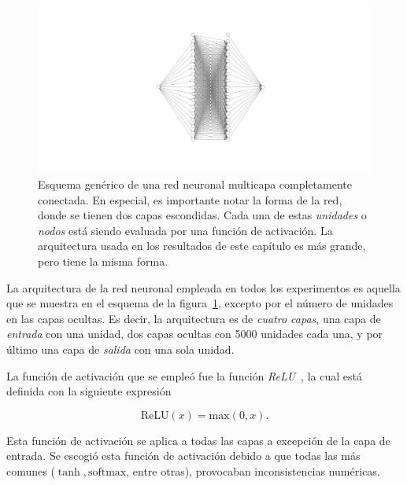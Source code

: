 \begin{figure}[t]
    \includegraphics[width=\textwidth]{figuras/capitulo-3/neural-network.pdf}
    \vspace{-1.5cm}
    \caption{Esquema genérico de una red neuronal multicapa completamente conectada. En especial, es importante notar la forma de la red, donde se tienen dos capas escondidas. Cada una de estas \emph{unidades} o \emph{nodos} está siendo evaluada por una función de activación. La arquitectura usada en los resultados de este capítulo es más grande, pero tiene la misma forma.}
    \label{fig:nn-esquema}
\end{figure}

La arquitectura de la red neuronal empleada en todos los experimentos es aquella que se
muestra en el esquema de la figura~\ref{fig:nn-esquema}, excepto por el número de unidades
en las capas ocultas.
Es decir, la arquitectura es de \emph{cuatro capas}, una capa de \emph{entrada} con una
unidad, dos capas ocultas con 5000 unidades cada una, y por último una capa de \emph{salida}
con una sola unidad.

La función de activación que se empleó fue la función \emph{ReLU}~\cite{glorotDeepSparseRectifier2011},
la cual está definida con la siguiente expresión

\begin{equation*}
    \text{ReLU}(x) = \text{max}{(0, x)} .
\end{equation*}

Esta función de activación se aplica a todas las capas a excepción de la capa de entrada.
Se escogió esta función de activación debido a que todas las más comunes ($\tanh, \text{softmax}$, entre otras),
provocaban inconsistencias numéricas.

